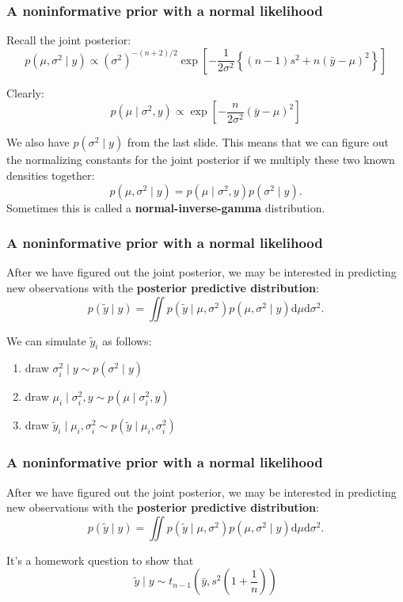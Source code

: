 \documentclass{beamer}
\begin{document}
\begin{frame}
\frametitle{A noninformative prior with a normal likelihood}

Recall the joint posterior:
\[
p(\mu, \sigma^2 \mid y) \propto (\sigma^2)^{-(n+2)/2}\exp\left[ - \frac{1}{2\sigma^2}\left\{(n-1)  s^2 + n(\bar{y} - \mu)^2 \right\} \right]
\]

Clearly:
\[
p(\mu \mid \sigma^2, y) \propto \exp\left[ - \frac{n}{2\sigma^2} (\bar{y} - \mu)^2  \right]
\]
\pause

We also have $p(\sigma^2 \mid y)$ from the last slide. This means that we can figure out the normalizing constants for the joint posterior if we multiply these two known densities together:
\[
p(\mu, \sigma^2 \mid y) = p(\mu \mid \sigma^2,y) p(\sigma^2 \mid y).
\]
Sometimes this is called a {\bf normal-inverse-gamma} distribution.

\end{frame}

\begin{frame}
\frametitle{A noninformative prior with a normal likelihood}

After we have figured out the joint posterior, we may be interested in predicting new observations with the {\bf posterior predictive distribution}:
\[
p(\tilde{y} \mid y) = \iint p(\tilde{y} \mid \mu, \sigma^2) p(\mu, \sigma^2 \mid y) \text{d} \mu \text{d} \sigma^2.
\]
\pause

We can simulate $\tilde{y}_i$ as follows:
\begin{enumerate}
\item draw $\sigma^2_i \mid y \sim p(\sigma^2 \mid y)$
\item draw $\mu_i \mid \sigma^2_i, y \sim p(\mu \mid \sigma^2_i, y)$
\item draw $\tilde{y}_i \mid \mu_i, \sigma^2_i \sim p(\tilde{y} \mid \mu_i, \sigma^2_i)$
\end{enumerate}


\end{frame}
\begin{frame}
\frametitle{A noninformative prior with a normal likelihood}

After we have figured out the joint posterior, we may be interested in predicting new observations with the {\bf posterior predictive distribution}:
\[
p(\tilde{y} \mid y) = \iint p(\tilde{y} \mid \mu, \sigma^2) p(\mu, \sigma^2 \mid y) \text{d} \mu \text{d} \sigma^2.
\]

It's a homework question to show that 
\[
\tilde{y} \mid y \sim t_{n-1}\left(\bar{y}, s^2\left(1 + \frac{1}{n} \right) \right)
\]

\end{frame}
\end{document}
